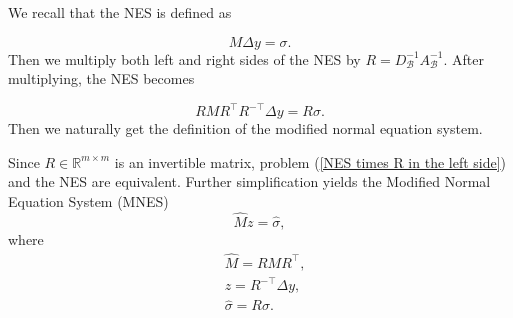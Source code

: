   We recall that the NES is defined as

$$
M \Delta y = \sigma.
$$
Then we multiply both left and right sides of the NES by $R=D_{\mathcal{B}}^{-1} A_{\mathcal{B}}^{-1}$.
After multiplying, the NES becomes

\begin{equation}\label{NES times R in the left side}
    R M R^{\top} R^{-\top} \Delta y=R\sigma.
\end{equation}
Then we naturally get the definition of the modified normal equation system. 
\begin{definition}
Since $R\in \mathbb{R}^{m \times m}$ is an invertible matrix, problem (\ref{NES times R in the left side}) and the NES are equivalent. Further simplification yields the Modified Normal Equation System (MNES)
\begin{equation}\label{MNES}
    \hat{M} z=\hat{\sigma},
\end{equation}
where
$$
\begin{aligned}
    & \hat{M} = R M R^{\top},\\
    & z = R^{-\top}\Delta y,\\
    & \hat{\sigma} = R \sigma.
\end{aligned}
$$
\end{definition}